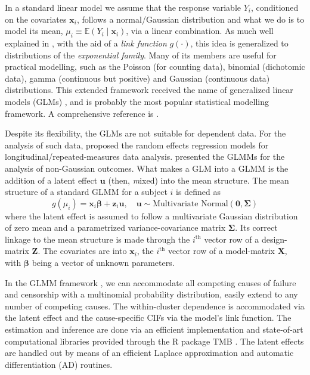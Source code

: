 In a standard linear model we assume that the response
variable \(Y_{i}\), conditioned on the covariates \(\bm{x}_{i}\),
follows a normal/Gaussian distribution and what we do is to model its
mean, \(\mu_{i} \equiv \mathbb{E}(Y_{i} \mid \bm{x}_{i})\), via a linear
combination. As much well explained in , with the aid
of a \textit{link function} \(g(\cdot)\), this idea is generalized to
distributions of the \textit{exponential family}. Many of its members
are useful for practical modelling, such as the Poisson (for counting
data), binomial (dichotomic data), gamma (continuous but positive) and
Gaussian (continuous data) distributions. This extended framework
received the name of generalized linear models (GLMs) \cite{GLM72}, and
is probably the most popular statistical modelling framework. A
comprehensive reference is .

 Despite its flexibility, the GLMs are not suitable for dependent
data. For the analysis of such data,  proposed the
random effects regression models for longitudinal/repeated-measures data
analysis.  presented the GLMMs for the analysis of
non-Gaussian outcomes. What makes a GLM into a GLMM is the addition of a
latent effect \(\bm{u}\) (then, \textit{m}ixed) into the mean
structure. The mean structure of a standard GLMM for a subject \(i\) is
defined as
\[
  g(\mu_{i}) = \bm{x}_{i}\bm{\beta} + \bm{z}_{i}\bm{u},
  \quad \bm{u} \sim \text{Multivariate Normal}(\bm{0},\bm{\Sigma})
\]
where the latent effect is assumed to follow a multivariate Gaussian
distribution of zero mean and a parametrized variance-covariance matrix
\(\bm{\Sigma}\). Its correct linkage to the mean structure is made
through the \(i^\text{th}\) vector row of a design-matrix \(\bm{Z}\).
The covariates are into \(\bm{x}_{i}\), the \(i^\text{th}\) vector row
of a model-matrix \(\bm{X}\), with \(\bm{\beta}\) being a vector of
unknown parameters.

In the GLMM framework \cite{GLMM}, we can accommodate all competing
causes of failure and censorship with a multinomial probability
distribution, easily extend to any number of competing causes. The
within-cluster dependence is accommodated via the latent effect and the
cause-specific CIFs via the model's link function. The estimation and
inference are done via an efficient implementation and state-of-art
computational libraries provided through the R \cite{R21} package
TMB \cite{TMB}. The latent effects are handled out by means of an
efficient Laplace approximation \cite{corestats,patrao} and automatic
differentiation (AD)
\cite{corestats,peyre} routines.

